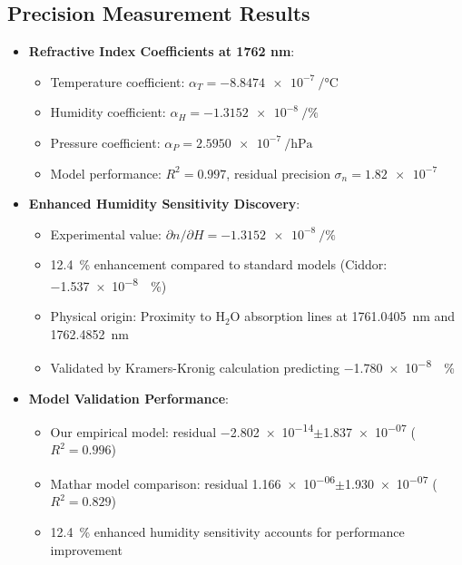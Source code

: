 \documentclass[aip,reprint,groupedaddress,onecolumn,superscriptaddress]{revtex4-2}
\begin{document}
\subsection{Precision Measurement Results}
\begin{itemize}
    \item \textbf{Refractive Index Coefficients at 1762 nm}:
    \begin{itemize}
        \item Temperature coefficient: $\alpha_T = \SI{-8.8474e-7}{\per\degreeCelsius}$
        \item Humidity coefficient: $\alpha_H = \SI{-1.3152e-8}{\per\percent}$
        \item Pressure coefficient: $\alpha_P = \SI{+2.5950e-7}{\per\hecto\pascal}$
        \item Model performance: $R^2 = 0.997$, residual precision $\sigma_n = \num{1.82e-7}$
    \end{itemize}
    
    \item \textbf{Enhanced Humidity Sensitivity Discovery}:
    \begin{itemize}
        \item Experimental value: $\partial n/\partial H = \SI{-1.3152e-8}{\per\percent}$
        \item \SI{12.4}{\percent} enhancement compared to standard models (Ciddor: \SI{-1.537e-8}{\per\percent})
        \item Physical origin: Proximity to H$_2$O absorption lines at \SI{1761.0405}{\nano\meter} and \SI{1762.4852}{\nano\meter}
        \item Validated by Kramers-Kronig calculation predicting \SI{-1.780e-8}{\per\percent}
    \end{itemize}
    
    \item \textbf{Model Validation Performance}:
    \begin{itemize}
        \item Our empirical model: residual \num{-2.802e-14}$\pm$\num{1.837e-07} ($R^2 = 0.996$)
        \item Mathar model comparison: residual \num{1.166e-06}$\pm$\num{1.930e-07} ($R^2 = 0.829$)
        \item \SI{12.4}{\percent} enhanced humidity sensitivity accounts for performance improvement
    \end{itemize}
\end{itemize}
\end{document}
